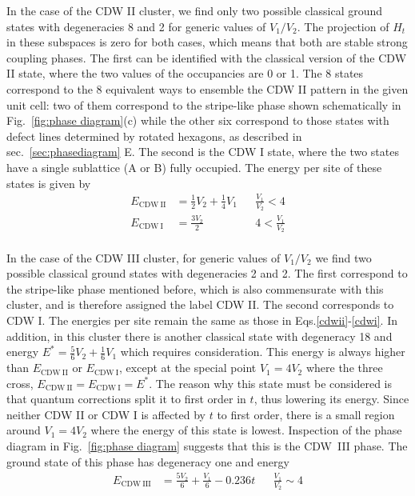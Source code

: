 \documentclass[aps,prx,10pt,twocolumn,floatfix,superscriptaddress,showpacs,numerical,footinbib]{revtex4-1}
\begin{document}
In the case of the CDW II cluster, we find only two possible classical ground states with degeneracies 8 and 2 for generic values of $V_1/V_2$. 
% 
The projection of $H_t$ in these subspaces is zero for both cases, which means that both are stable strong coupling phases.
%
The first can be identified with the classical version of the CDW II state, where the two values of the occupancies are 0 or 1.
%
The 8 states correspond to the 8 equivalent ways to ensemble the CDW II pattern in the given unit cell: two of them correspond to the stripe-like phase
shown schematically in Fig.~\ref{fig:phase diagram}(c) while the other six correspond to those states with defect lines determined by rotated hexagons, as described in sec.~\ref{sec:phasediagram} E. 
%
The second is the CDW I state, where the two states have a single sublattice (A or B) fully occupied. The energy per site of these states is given by
%
\begin{align}
E_{\mathrm{CDW~II}} &= \frac{1}{2}V_2 + \frac{1}{4}V_1 & & \tfrac{V_1}{V_2} < 4 \label{cdwii} \\
E_{\mathrm{CDW~I}} &= \frac{3V_2}{2}   & & 4 < \tfrac{V_1}{V_2}\label{cdwi}
\end{align}
\\
%
In the case of the CDW III cluster, for generic values of $V_1/V_2$ we find two possible classical ground states with degeneracies 2 and 2. 
%
The first correspond to the stripe-like phase mentioned before, which is also commensurate with this cluster, and is therefore assigned the label CDW II. The second corresponds to CDW I. The energies per site remain the same as those in Eqs.\ref{cdwii}-\ref{cdwi}. 
%
In addition, in this cluster there is another classical state with degeneracy 18 and energy $E^*=\frac{5}{6}V_2 + \frac{1}{6}V_1$ which requires consideration.  
%
This energy is always higher than $E_{\mathrm{CDW~II}}$ or $E_{\mathrm{CDW~I}}$, except at the special point $V_1=4V_2$ where the three cross, $E_{\mathrm{CDW~II}}=E_{\mathrm{CDW~I}}=E^*$. 
%
The reason why this state must be considered is that quantum corrections split it to first order in $t$, thus lowering its energy. Since neither CDW II or CDW I is affected by $t$ to first order, there is a small region around $V_1=4V_2$ where the energy of this state is lowest. 
%
Inspection of the phase diagram in Fig.~\ref{fig:phase diagram} suggests that this is the CDW~III phase. The ground state of this phase has degeneracy one and energy
%
\begin{align}
E_{\mathrm{CDW~III}} &= \frac{5V_2}{6} + \frac{V_1}{6} - 0.236t   & & \tfrac{V_1}{V_2} \sim 4 \label{cdwiii}
\end{align}
\end{document}
